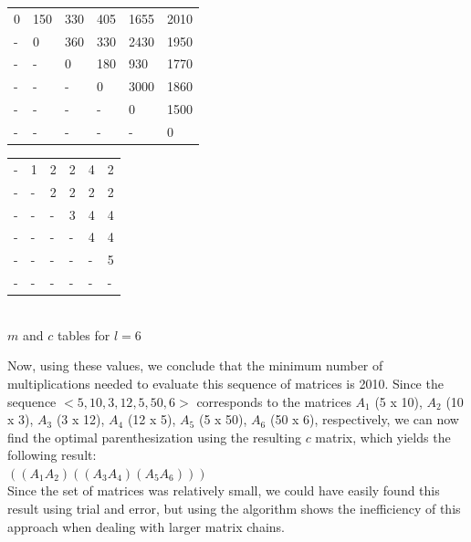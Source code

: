 \documentclass[11pt]{article}
\begin{document}
\begin{sol}
{%
	\centering
	\begin{tabular}{|l|l|l|l|l|l|}
		 \hline
        0 & 150 & 330 & 405 & 1655 & 2010 \\ 
        - & 0 & 360 &330 & 2430 & 1950 \\ 
        - & - & 0 & 180 & 930 & 1770 \\ 
        - & - & - & 0 & 3000 & 1860\\ 
        - & - & - & - & 0 & 1500  \\ 
        - & - & - & - & - & 0 \\
        \hline
	\end{tabular}
	\hspace{20mm}
	\begin{tabular}{|l|l|l|l|l|l|}
		 \hline
        - & 1 & 2 & 2 & 4 & 2 \\ 
        - & - & 2 & 2 & 2 & 2 \\ 
        - & - & - & 3 & 4 & 4 \\ 
        - & - & - & - & 4 & 4 \\ 
        - & - & - & - & - & 5 \\ 
        - & - & - & - & - & - \\
        \hline
	\end{tabular} \\ 
\vspace{0.5cm}
$m$ and $c$ tables for $l = 6$\\ 
\vspace{0.5cm}
}

Now, using these values, we conclude that the minimum number of multiplications needed to evaluate this sequence of matrices is 2010. Since the sequence $<5, 10, 3, 12, 5, 50, 6>$ corresponds to the matrices $A_1$ (5 x 10), $A_2$ (10 x 3), $A_3$ (3 x 12), $A_4$ (12 x 5), $A_5$ (5 x 50), $A_6$ (50 x 6), respectively, we can now find the optimal parenthesization using the resulting $c$ matrix, which yields the following result: \\ 

$((A_1A_2)((A_3A_4)(A_5A_6)))$\\

Since the set of matrices was relatively small, we could have easily found this result using trial and error, but using the algorithm shows the inefficiency of this approach when dealing with larger matrix chains.

\end{sol}
\end{document}
